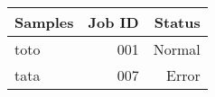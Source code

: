 \begin{table}[ht]
\centering
\begin{tabular}{l|r|r}
Samples & Job ID & Status \\\hline
toto & 001 & Normal \\
tata & 007 & Error
\end{tabular}
\end{table}
